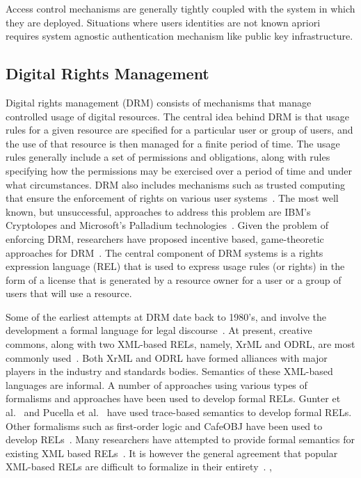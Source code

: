 Access control mechanisms are generally tightly coupled with the system in which they are deployed. Situations where users identities are not known apriori requires system agnostic authentication mechanism like public key infrastructure. 

\subsection{Digital Rights Management}
Digital rights management (DRM) consists of mechanisms that manage controlled usage of digital resources. The central idea behind DRM is that usage rules for a given resource are specified for a particular user or group of users, and the use of that resource is then managed for a finite period of time.  The usage rules generally include a set of permissions and obligations, along with rules specifying how the permissions may be exercised over a period of time and under what circumstances. DRM also includes mechanisms such as trusted computing that ensure the enforcement of rights on various user systems~\cite{SaSt:04}. The most well known, but unsuccessful, approaches to address this problem are IBM's Cryptolopes and Microsoft's Palladium technologies~\cite{CaJuPoLe:02,IBM:02,KoLoKa:97}.  Given the problem of enforcing DRM, researchers have proposed incentive based, game-theoretic approaches for DRM~\cite{HeJaKhHr:07,ZhPeMaYaHa:09}. The central component of DRM systems is a rights expression language (REL) that is used to express usage rules (or rights) in the form of a license that is generated by a resource owner for a user or a group of users that will use a resource.  

Some of the earliest attempts at DRM date back to 1980's, and involve the development a formal language for legal discourse~\cite{Bo:88,McG:88,McC:89}. At present, creative commons, along with two XML-based RELs, namely, XrML and ODRL, are most commonly used~\cite{XrML:02,Ia:00}. Both XrML and ODRL have formed alliances with major players in the industry and standards bodies.  Semantics of these XML-based languages are informal. A number of approaches using various types of formalisms and approaches have been used to develop formal RELs. Gunter et al.~\cite{GuWeWr:01} and Pucella et al.~\cite{PuWe:02} have used trace-based semantics to develop formal RELs. Other formalisms such as first-order logic and CafeOBJ have been used to develop RELs~\cite{ArHu:07,ChCoEtHaJoLa:03,XiBjFu:08}. Many researchers have attempted to provide formal semantics for existing XML based RELs~\cite{HaWe:04,PuWe:06,HaWe:08}. It is however the general agreement that popular XML-based RELs are difficult to formalize in their entirety~\cite{HaWe:04,HaWe:08,JaHeMa:06}. ,

